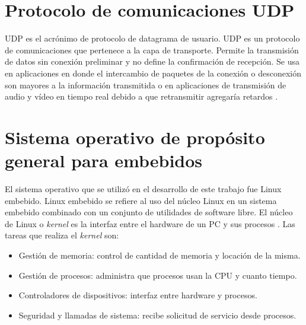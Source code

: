 

\section{Protocolo de comunicaciones UDP}
UDP es el acrónimo de protocolo de datagrama de usuario. UDP es un protocolo de comunicaciones que pertenece a la capa de transporte. Permite la transmisión de datos sin conexión preliminar y no define la confirmación de recepción. Se usa en aplicaciones en donde el intercambio de paquetes de la conexión o desconexión son mayores a la información transmitida o en aplicaciones de transmisión de audio y vídeo en tiempo real debido a que retransmitir agregaría retardos \citep{WIKIUDP}.





\pagebreak
\section{Sistema operativo de propósito general para embebidos}

El sistema operativo que se utilizó en el desarrollo de este trabajo fue Linux embebido. Linux embebido se refiere al uso del núcleo Linux  en un sistema embebido combinado con un conjunto de utilidades de software libre. 
El núcleo de Linux o \textit{kernel} es la interfaz entre el hardware de un PC y sus procesos \citep{KERNEL}. Las tareas que realiza el \textit{kernel} son:

\begin{itemize}
\item Gestión de memoria: control de cantidad de memoria y locación de la misma.
\item Gestión de procesos: administra que procesos usan la CPU y cuanto tiempo.
\item Controladores de dispositivos: interfaz entre hardware y procesos.
\item Seguridad y llamadas de sistema: recibe solicitud de servicio desde procesos. 
\end{itemize}

